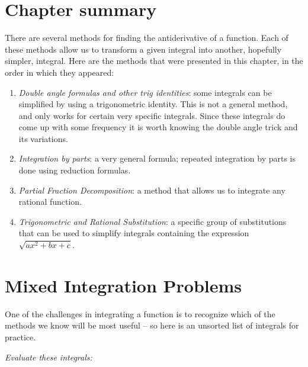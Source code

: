 \section{Chapter summary} %

There are several methods for finding the antiderivative of a function.  Each of
these methods allow us to transform a given integral into another, hopefully
simpler, integral.  Here are the methods that were presented in this chapter, in
the order in which they appeared:
\begin{enumerate}
\item \textit{Double angle formulas and other trig identities}: some integrals
  can be simplified by using a trigonometric identity.  This is not a general
  method, and only works for certain very specific integrals.  Since these
  integrals do come up with some frequency it is worth knowing the double angle
  trick and its variations.
\item \textit{Integration by parts}: a very general formula; repeated
  integration by parts is done using reduction formulas.
\item \textit{Partial Fraction Decomposition}: a method that allows us to
  integrate any rational function.
\item \textit{Trigonometric and Rational Substitution}: a specific group of
  substitutions that can be used to simplify integrals containing the expression
  $\sqrt{ax^2+bx+c}$.
\end{enumerate}

\section{Mixed Integration Problems} %

One of the challenges in integrating a function is to recognize which of the
methods we know will be most useful -- so here is an unsorted list of integrals
for practice.

\problemfont %



\centerline{\textcolor{badgerred}{\itshape Evaluate these integrals:}}

